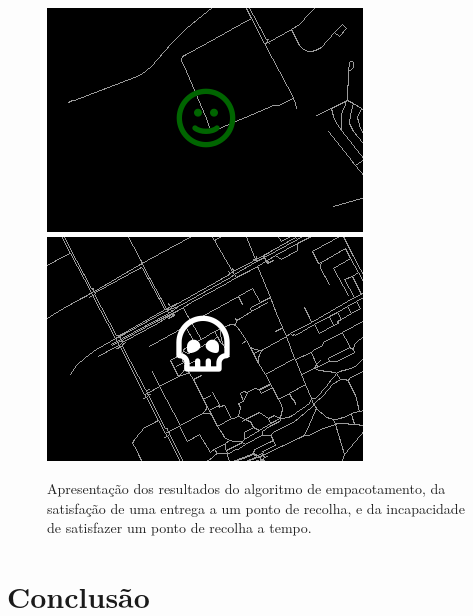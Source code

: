 \documentclass[12pt, a4paper, titlepage]{article}
\begin{document}
\begin{figure}[H]
\begin{minipage}{0.32\textwidth}
    \end{minipage}
    \begin{minipage}{0.45\textwidth}
        \includegraphics[width=\textwidth]{res/Sucesso.png}
        \includegraphics[width=\textwidth]{res/Morte.png}
    \end{minipage}
    \caption{
        Apresentação dos resultados do algoritmo de empacotamento, da satisfação de uma entrega a um
        ponto de recolha, e da incapacidade de satisfazer um ponto de recolha a tempo.
    }
\end{figure}

\section{Conclusão}
\end{document}
